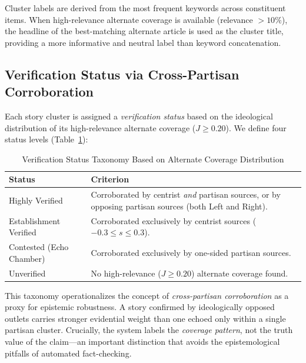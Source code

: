 \documentclass[10pt, conference, compsoc]{IEEEtran}
\begin{document}
Cluster labels are derived from the most frequent keywords across constituent items. When high-relevance alternate coverage is available (relevance $> 10\%$), the headline of the best-matching alternate article is used as the cluster title, providing a more informative and neutral label than keyword concatenation.

\subsection{Verification Status via Cross-Partisan Corroboration}
Each story cluster is assigned a \textit{verification status} based on the ideological distribution of its high-relevance alternate coverage ($J \geq 0.20$). We define four status levels (Table~\ref{tab:verification}):

\begin{table}[htbp]
\caption{Verification Status Taxonomy Based on Alternate Coverage Distribution}
\begin{center}
\begin{tabular}{p{2.8cm} p{5.2cm}}
\toprule
\textbf{Status} & \textbf{Criterion} \\
\midrule
Highly Verified & Corroborated by centrist \textit{and} partisan sources, or by opposing partisan sources (both Left and Right). \\
Establishment Verified & Corroborated exclusively by centrist sources ($-0.3 \leq s \leq 0.3$). \\
Contested (Echo Chamber) & Corroborated exclusively by one-sided partisan sources. \\
Unverified & No high-relevance ($J \geq 0.20$) alternate coverage found. \\
\bottomrule
\end{tabular}
\label{tab:verification}
\end{center}
\end{table}

This taxonomy operationalizes the concept of \textit{cross-partisan corroboration} as a proxy for epistemic robustness. A story confirmed by ideologically opposed outlets carries stronger evidential weight than one echoed only within a single partisan cluster. Crucially, the system labels the \textit{coverage pattern}, not the truth value of the claim—an important distinction that avoids the epistemological pitfalls of automated fact-checking.

\end{document}
